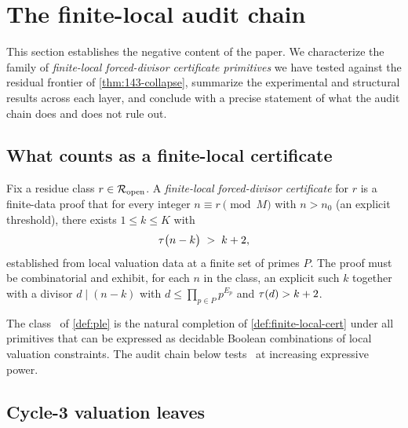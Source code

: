 
\section{The finite-local audit chain}
\label{sec:csp-audit}

This section establishes the negative content of the paper. We
characterize the family of \emph{finite-local forced-divisor
certificate primitives} we have tested against the residual frontier
of \cref{thm:143-collapse}, summarize the experimental and structural
results across each layer, and conclude with a precise statement of
what the audit chain does and does not rule out.

\subsection{What counts as a finite-local certificate}
\label{sec:ple-formal}

\begin{definition}
\label{def:finite-local-cert}
Fix a residue class $r \in \mathcal{R}_{\mathrm{open}}$. A \emph{finite-local
forced-divisor certificate} for $r$ is a finite-data proof that for
every integer $n \equiv r \pmod M$ with $n > n_0$ (an explicit
threshold), there exists $1 \le k \le K$ with
\[
\tau\bigl( n - k \bigr) \;>\; k + 2 ,
\]
established from local valuation data at a finite set of primes
$P$. The proof must be combinatorial and exhibit, for each $n$ in the
class, an explicit such $k$ together with a divisor $d \mid (n - k)$
with $d \le \prod_{p \in P} p^{E_p}$ and $\tau(d) > k + 2$.
\end{definition}

The class \PLEclass\ of \cref{def:ple} is the natural completion of
\cref{def:finite-local-cert} under all primitives that can be
expressed as decidable Boolean combinations of local valuation
constraints. The audit chain below tests \PLEclass\ at increasing
expressive power.

\subsection{Cycle-3 valuation leaves}
\label{sec:cycle3-audit}

